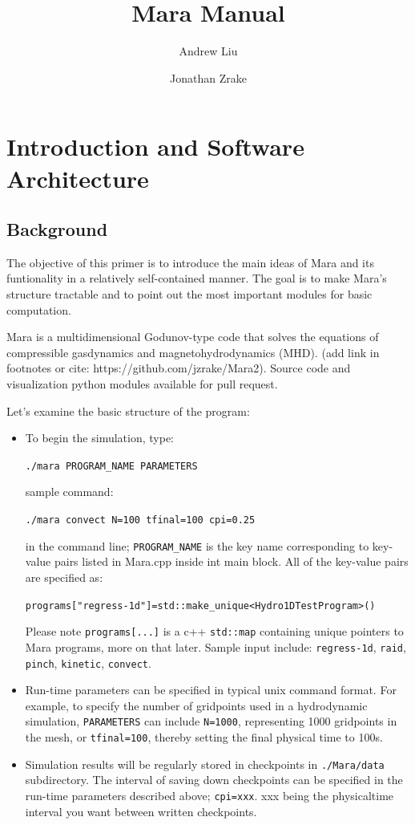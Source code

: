 \documentclass{article}
\title{Mara Manual}
\author{Andrew Liu \and Jonathan Zrake}
\begin{document}
\maketitle

\section{Introduction and Software Architecture}
\subsection{Background}
The objective of this primer is to introduce the main ideas of Mara and its funtionality in a relatively self-contained manner. The goal is to make Mara's structure tractable and to point out the most important modules for basic computation.

Mara is a multidimensional Godunov-type code that solves the equations of
compressible gasdynamics and magnetohydrodynamics (MHD). (add link in footnotes or cite: https://github.com/jzrake/Mara2). Source code and visualization python modules available for pull request.

Let's examine the basic structure of the program:
\begin{itemize}
	\item To begin the simulation, type: 

	\texttt{./mara PROGRAM\_NAME PARAMETERS}

	sample command:

\texttt{./mara convect N=100 tfinal=100 cpi=0.25}
	
in the command line; \texttt{PROGRAM\_NAME} is the key name corresponding to key-value pairs listed in Mara.cpp inside int main block. All of the key-value pairs are specified as: 

\texttt{programs["regress-1d"]=std::make\_unique<Hydro1DTestProgram>()}

Please note \texttt{programs[...]} is a c++ \texttt{std::map} containing unique pointers to Mara programs, more on that later. Sample input include: \texttt{regress-1d}, \texttt{raid}, \texttt{pinch}, \texttt{kinetic}, \texttt{convect}.

	\item Run-time parameters can be specified in typical unix command format. For example, to specify the number of gridpoints used in a hydrodynamic simulation, \texttt{PARAMETERS} can include \texttt{N=1000}, representing 1000 gridpoints in the mesh, or \texttt{tfinal=100}, thereby setting the final physical time to 100s.  
	
	\item Simulation results will be regularly stored in checkpoints in \texttt{./Mara/data} subdirectory. The interval of saving down checkpoints can be specified in the run-time parameters described above; \texttt{cpi=xxx}. xxx being the physicaltime interval you want between written checkpoints.
	

\end{itemize}
\end{document}
